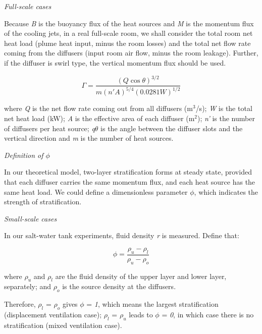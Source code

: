 {\emph{Full-scale cases}

Because \emph{B} is the buoyancy flux of the heat sources and \emph{M} is the momentum flux of the cooling jets, in a real full-scale room, we shall consider the total room net heat load (plume heat input, minus the room losses) and the total net flow rate coming from the diffusers (input room air flow, minus the room leakage). Further, if the diffuser is swirl type, the vertical momentum flux should be used.

\begin{equation}
\Gamma  = \frac{{{{(Q\cos \theta )}^{3/2}}}}{{m{{(n'A)}^{5/4}}{{(0.0281W)}^{1/2}}}}
\label{eq:GammaFullScaleCases}
\end{equation}

where \emph{Q} is the net flow rate coming out from all diffusers (m\(^{3}\)/s); \emph{W} is the total net heat load (kW); \emph{A} is the effective area of each diffuser (m\(^{2}\)); \emph{n'} is the number of diffusers per heat source; \emph{q\(\theta\)} is the angle between the diffuser slots and the vertical direction and \emph{m} is the number of heat sources.

\emph{Definition of \(\phi\)}

In our theoretical model, two-layer stratification forms at steady state, provided that each diffuser carries the same momentum flux, and each heat source has the same heat load. We could define a dimensionless parameter \emph{\(\phi\)}, which indicates the strength of stratification.

\emph{Small-scale cases}

In our salt-water tank experiments, fluid density \emph{r} is measured. Define that:

\begin{equation}
\phi  = \frac{{{\rho_u} - {\rho_l}}}{{{\rho_u} - {\rho_o}}}
\label{eq:PhiSmallScaleCases}
\end{equation}

where \emph{\(\rho_{u}\)} and \emph{\(\rho_{l}\)} are the fluid density of the upper layer and lower layer, separately; and \emph{\(\rho_{o}\)} is the source density at the diffusers.

Therefore, \emph{\(\rho_{l}\)} = \emph{\(\rho_{o}\)} gives \emph{\(\phi\)} = \emph{1}, which means the largest stratification (displacement ventilation case); \emph{\(\rho_{l}\)} = \emph{\(\rho_{u}\)} leads to \emph{\(\phi\)} = \emph{0}, in which case there is no stratification (mixed ventilation case).

}
